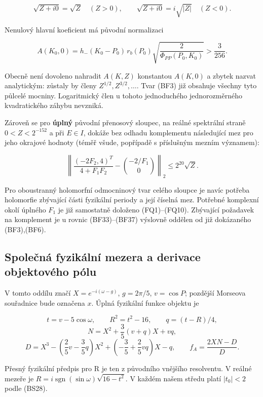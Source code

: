 \documentclass[11pt,a4paper]{article}
\theoremstyle{remark}\newtheorem{remark}[theorem]{Poznámka}
\numberwithin{equation}{section}
\begin{document}
\[
\sqrt{Z+i0}=\sqrt Z\quad(Z>0),\qquad
\sqrt{Z+i0}=i\sqrt{|Z|}\quad(Z<0).
\tag{BF4}
\]

Nenulový hlavní koeficient má původní normalizaci

\[
\boxed{
A(K_0,0)=h_{-}(K_0-P_0)\,r_b(P_0)
\sqrt{\frac{2}{\Phi_{PP}(P_0,K_0)}}>\frac3{256}.}
\tag{BF5}
\]

Obecně není dovoleno nahradit \(A(K,Z)\) konstantou \(A(K,0)\) a zbytek
nazvat analytickým: zůstaly by členy \(Z^{1/2},Z^{3/2},\ldots\). Tvar
(BF3) již obsahuje všechny tyto půlcelé mocniny. Logaritmický člen u
tohoto jednoduchého jednorozměrného kvadratického záhybu nevzniká.

Zároveň se pro \textbf{úplný} původní přenosový sloupec, na reálné
spektrální straně \(0<Z<2^{-152}\) a při \(E\in I\), dokáže bez odhadu
komplementu následující mez pro jeho okrajové hodnoty (téměř všude,
popřípadě s příslušným mezním významem):

\[
\boxed{
\left\|
\frac{(-2F_2,4)^T}{4+F_1F_2}
-\binom{-2/F_1}{0}
\right\|_2\le 2^{20}\sqrt Z.}
\tag{BF6}
\]

Pro oboustranný holomorfní odmocninový tvar celého sloupce je navíc
potřeba holomorfie zbývající části fyzikální periody a její číselná mez.
Potřebné komplexní okolí úplného \(F_1\) je již samostatně doloženo
(FQ1)--(FQ10). Zbývající požadavek na komplement je u rovnic (BF33)--(BF37) výslovně
oddělen od již dokázaného (BF3),(BF6).

\hypertarget{spoleux10dnuxe1-fyzikuxe1lnuxed-mezera-a-derivace-objektovuxe9ho-puxf3lu}{%
\subsection{Společná fyzikální mezera a derivace objektového
pólu}\label{spoleux10dnuxe1-fyzikuxe1lnuxed-mezera-a-derivace-objektovuxe9ho-puxf3lu}}

V tomto oddílu značí \(X=e^{-i(\omega-g)}\), \(g=2\pi/5\), \(v=\cos P\);
pozdější Morseova souřadnice bude označena \(x\). Úplná fyzikální funkce
objektu je

\[
t=v-5\cos\omega,\qquad R^2=t^2-16,\qquad q=(t-R)/4,
\] \[
N=X^2+\frac35(v+q)X+vq,
\] \[
D=X^3-\left(\frac25v-\frac35q\right)X^2
+\left(-\frac35+\frac25vq\right)X-q,
\qquad f_A=\frac{2XN-D}{D}.
\tag{BF7}
\]

Přesný fyzikální předpis pro R je ten z původního vnějšího resolventu. V
reálné mezeře je \(R=i\operatorname{sgn}(\sin\omega)\sqrt{16-t^2}\). V
každém našem středu platí \(|t_0|<2\) podle (BS28).
\end{document}
